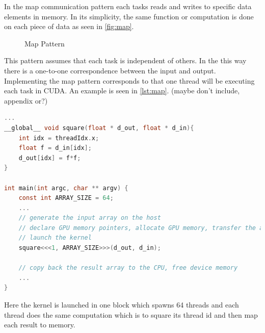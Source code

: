 In the map communication pattern each tasks reads and writes to specific data elements in memory.
In its simplicity, the same function or computation is done on each piece of data as seen in \autoref{fig:map}.

\begin{figure}[ht]
	\centering
	\caption{Map Pattern}
	\label{fig:map}
\end{figure}
This pattern assumes that each task is independent of others.
In the this way there is a one-to-one correspondence between the input and output.
Implementing the map pattern corresponds to that one thread will be executing each task in CUDA.
An example is seen in \autoref{lst:map}. (maybe don't include, appendix or?)

\begin{lstlisting}[language=C,caption={Squaring thread id using map pattern},label=lst:map]
...
__global__ void square(float * d_out, float * d_in){
	int idx = threadIdx.x;
	float f = d_in[idx];
	d_out[idx] = f*f; 	
}

int main(int argc, char ** argv) {
	const int ARRAY_SIZE = 64;
	...
	// generate the input array on the host
	// declare GPU memory pointers, allocate GPU memory, transfer the array to the GPU
	// launch the kernel
	square<<<1, ARRAY_SIZE>>>(d_out, d_in);

	// copy back the result array to the CPU, free device memory
	...
}
\end{lstlisting}


Here the kernel is launched in one block which spawns 64 threads and each thread does the same computation which is to square its thread id and then map each result to memory.